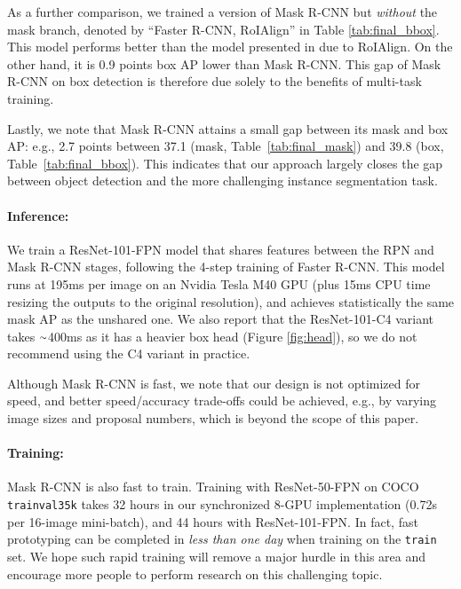 As a further comparison, we trained a version of Mask R-CNN but \emph{without} the mask branch, denoted by ``Faster R-CNN, RoIAlign'' in Table \ref{tab:final_bbox}. This model performs better than the model presented in due to RoIAlign. On the other hand, it is 0.9 points box AP lower than Mask R-CNN. This gap of Mask R-CNN on box detection is therefore due solely to the benefits of multi-task training.

Lastly, we note that Mask R-CNN attains a small gap between its mask and box AP: e.g., 2.7 points between 37.1 (mask, Table~\ref{tab:final_mask}) and 39.8 (box, Table~\ref{tab:final_bbox}). This indicates that our approach largely closes the gap between object detection and the more challenging instance segmentation task.


\paragraph{Inference:} We train a ResNet-101-FPN model that shares features between the RPN and Mask R-CNN stages, following the 4-step training of Faster R-CNN. This model runs at 195ms per image on an Nvidia Tesla M40 GPU (plus 15ms CPU time resizing the outputs to the original resolution), and achieves statistically the same mask AP as the unshared one. We also report that the ResNet-101-C4 variant takes $\app$400ms as it has a heavier box head (Figure \ref{fig:head}), so we do not recommend using the C4 variant in practice.

Although Mask R-CNN is fast, we note that our design is not optimized for speed, and better speed/accuracy trade-offs could be achieved, e.g., by varying image sizes and proposal numbers, which is beyond the scope of this paper.

\paragraph{Training:} Mask R-CNN is also fast to train. Training with ResNet-50-FPN on COCO \texttt{trainval35k} takes 32 hours in our synchronized 8-GPU implementation (0.72s per 16-image mini-batch), and 44 hours with ResNet-101-FPN. In fact, fast prototyping can be completed in \emph{less than one day} when training on the \texttt{train} set. We hope such rapid training will remove a major hurdle in this area and encourage more people to perform research on this challenging topic.

\label{sec:keypoints}

